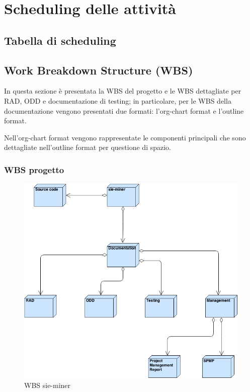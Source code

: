 \chapter{Scheduling delle attività}
\section{Tabella di scheduling}
%
%
\clearpage
\section{Work Breakdown Structure (WBS)}
In questa sezione è presentata la WBS del progetto e le WBS dettagliate per RAD, ODD e documentazione di testing; in particolare, per le WBS della documentazione vengono presentati due formati: l'org-chart format e l'outline format.

Nell'org-chart format vengono rappresentate le componenti principali che sono dettagliate nell'outline format per questione di spazio.
\subsection{WBS progetto}
\begin{figure}[ht]
\centering
\includegraphics[width=\textwidth]{img/WBS_master.png}
\caption{WBS sie-miner} 
\end{figure}
\clearpage


